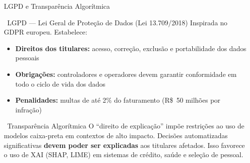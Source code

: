 \documentclass[aspectratio=169]{beamer}
\begin{document}
\begin{frame}{LGPD e Transparência Algorítmica}
    \begin{block}{\faGavel\ LGPD --- Lei Geral de Proteção de Dados (Lei 13.709/2018)}
        Inspirada no GDPR europeu. Estabelece:
        \begin{itemize}
            \item \textbf{Direitos dos titulares:} acesso, correção, exclusão e portabilidade dos dados pessoais
            \item \textbf{Obrigações:} controladores e operadores devem garantir conformidade em todo o ciclo de vida dos dados
            \item \textbf{Penalidades:} multas de até 2\% do faturamento (R\$~50 milhões por infração)
        \end{itemize}
    \end{block}
    \vspace{0.2cm}
    \begin{block}{\faEye\ Transparência Algorítmica}
        O ``direito de explicação'' impõe restrições ao uso de modelos caixa-preta em contextos de alto impacto.
        Decisões automatizadas significativas \textbf{devem poder ser explicadas} aos titulares afetados.
        Isso favorece o uso de XAI (SHAP, LIME) em sistemas de crédito, saúde e seleção de pessoal.
    \end{block}
\end{frame}
\end{document}

